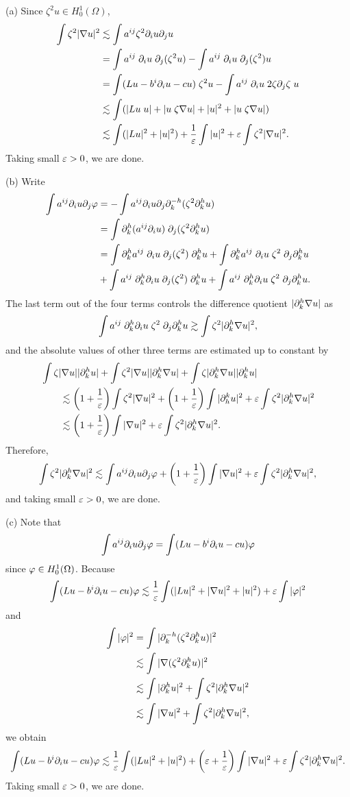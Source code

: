 \documentclass{../../large}
\begin{document}
\begin{pf}
(a)
Since $\zeta^2u\in H_0^1(\Omega)$,
\begin{align*}
\int\zeta^2|\nabla u|^2
&\lesssim\int a^{ij}\zeta^2\pd_iu\pd_ju\\
&=\int a^{ij}\;\pd_iu\;\pd_j(\zeta^2u)-\int a^{ij}\;\pd_iu\;\pd_j(\zeta^2)u\\
&=\int(Lu-b^i\pd_iu-cu)\;\zeta^2u-\int a^{ij}\;\pd_iu\;2\zeta\pd_j\zeta\;u\\
&\lesssim\int(|Lu\;u|+|u\;\zeta\nabla u|+|u|^2+|u\;\zeta\nabla u|)\\
&\lesssim\int(|Lu|^2+|u|^2)+\frac1\e\int|u|^2+\e\int\zeta^2|\nabla u|^2.
\end{align*}
Taking small $\varepsilon>0$, we are done.

(b)
Write
\begin{align*}
\int a^{ij}\pd_iu\pd_j\f
&=-\int a^{ij}\pd_iu\pd_j\pd_k^{-h}(\zeta^2\pd_k^hu)\\
&=\int\pd_k^h(a^{ij}\pd_iu)\;\pd_j(\zeta^2\pd_k^hu)\\
&=\int\pd_k^ha^{ij}\;\pd_iu\;\pd_j(\zeta^2)\;\pd_k^hu
+\int\pd_k^ha^{ij}\;\pd_iu\;\zeta^2\;\pd_j\pd_k^hu\\
&+\int a^{ij}\;\pd_k^h\pd_iu\;\pd_j(\zeta^2)\;\pd_k^hu
+\int a^{ij}\;\pd_k^h\pd_iu\;\zeta^2\;\pd_j\pd_k^hu.
\end{align*}
The last term out of the four terms controls the difference quotient $|\pd_k^h\nabla u|$ as
\[\int a^{ij}\;\pd_k^h\pd_iu\;\zeta^2\;\pd_j\pd_k^hu\gtrsim\int\zeta^2|\pd_k^h\nabla u|^2,\]
and the absolute values of other three terms are estimated up to constant by
\begin{align*}
&\int\zeta|\nabla u||\pd_k^h u|+\int\zeta^2|\nabla u||\pd_k^h\nabla u|+\int\zeta|\pd_k^h\nabla u||\pd_k^hu|\\
&\qquad\lesssim
\left(1+\frac1\e\right)\int\zeta^2|\nabla u|^2+\left(1+\frac1\e\right)\int|\pd_h^ku|^2+\e\int\zeta^2|\pd_k^h\nabla u|^2\\
&\qquad\lesssim
\left(1+\frac1\e\right)\int|\nabla u|^2+\e\int\zeta^2|\pd_k^h\nabla u|^2.
\end{align*}
Therefore,
\[\int\zeta^2|\pd_k^h\nabla u|^2\lesssim\int a^{ij}\pd_iu\pd_j\f+\left(1+\frac1\e\right)\int|\nabla u|^2+\e\int\zeta^2|\pd_k^h\nabla u|^2,\]
and taking small $\varepsilon>0$, we are done.

(c)
Note that
\[\int a^{ij}\pd_iu\pd_j\f=\int(Lu-b^i\pd_iu-cu)\f\]
since $\varphi\in H_0^1(\Omega)$.
Because
\[\int(Lu-b^i\pd_iu-cu)\f
\lesssim\frac1\e\int(|Lu|^2+|\nabla u|^2+|u|^2)+\e\int|\f|^2\]
and
\begin{align*}
\int|\f|^2&=\int|\pd_k^{-h}(\zeta^2\pd_k^hu)|^2\\
&\lesssim\int|\nabla(\zeta^2\pd_k^hu)|^2\\
&\lesssim\int|\pd_k^hu|^2+\int\zeta^2|\pd_k^h\nabla u|^2\\
&\lesssim\int|\nabla u|^2+\int\zeta^2|\pd_k^h\nabla u|^2,
\end{align*}
we obtain
\[\int(Lu-b^i\pd_iu-cu)\f
\lesssim\frac1\e\int(|Lu|^2+|u|^2)+\left(\e+\frac1\e\right)\int|\nabla u|^2+\e\int\zeta^2|\pd_k^h\nabla u|^2.\]
Taking small $\varepsilon>0$, we are done.
\end{pf}
\end{document}
